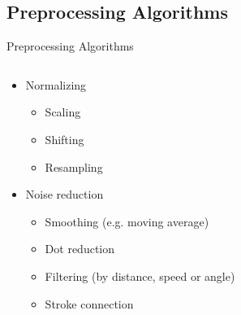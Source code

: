 \subsection{Preprocessing Algorithms}
\begin{frame}{Preprocessing Algorithms}
    \begin{columns}[T] %
    \begin{column}[T]{5cm} %
        \begin{itemize}
            \item<1-> Normalizing
            \begin{itemize}
                \item<2-> Scaling
                \item<2-> Shifting
                \item<3-> Resampling
            \end{itemize}
            \item<1-> Noise reduction
            \begin{itemize}
                \item<4-> Smoothing (e.g. moving average)
                \item<5-> Dot reduction
                \item<6-> Filtering (by distance, speed or angle)
                \item<8-> Stroke connection
            \end{itemize}
        \end{itemize}
    \end{column}
    \begin{column}[T]{6cm} %
    \end{column}
    \end{columns}
\end{frame}